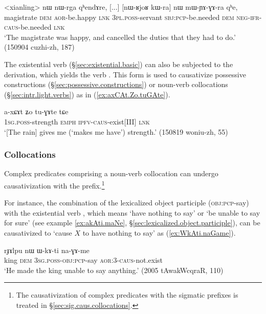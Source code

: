 \begin{exe}
\ex \label{ex:mWYAGAra}
\gll <xianling> nɯ nɯ-rga qʰendɤre, [...] [nɯ-ʁjoʁ kɯ-ra] nɯ mɯ-ɲɤ-ɣɤ-ra qʰe, \\
magistrate \textsc{dem} \textsc{aor}-be.happy \textsc{lnk} { } \textsc{3pl}.\textsc{poss}-servant \textsc{sbj}:\textsc{pcp}-be.needed \textsc{dem} \textsc{neg}-\textsc{ifr}-\textsc{caus}-be.needed \textsc{lnk} \\
\glt `The magistrate was happy, and cancelled the duties that they had to do.' (150904 cuzhi-zh, 187)
\end{exe}
 
 The existential verb   (§\ref{sec:existential.basic}) can also be subjected to the  derivation, which yields the verb . This form is used to causativize possessive constructions (§\ref {sec:possessive.constructions}) or noun-verb collocations (§\ref{sec:intr.light.verbs}) as in (\ref{ex:axCAt.Zo.tuGAte}).
 
\begin{exe}
\ex \label{ex:axCAt.Zo.tuGAte}
\gll  a-xɕɤt ʑo tu-ɣɤte tɕe \\
\textsc{1sg}.\textsc{poss}-strength \textsc{emph} \textsc{ipfv}-\textsc{caus}-exist[III] \textsc{lnk} \\
\glt `[The rain] gives me (`makes me have') strength.' (150819 woniu-zh, 55)
\end{exe}

\subsubsection{Collocations} \label{sec:velar.causative.collocation}
Complex predicates comprising a noun-verb collocation can undergo causativization with the  prefix.\footnote{The causativization of complex predicates with the sigmatic prefixes is treated in §\ref{sec:sig.caus.collocations}. }

For instance, the combination of the lexicalized object participle  (\textsc{obj}:\textsc{pcp}-say) with the existential verb , which means  `have nothing to say' or `be unable to say for sure' (see example \ref{ex:akAti.maNe}, §\ref{sec:lexicalized.object.participle}), can be causativized to  `cause $X$ to have nothing to say' as (\ref{ex:WkAti.naGame}).

\begin{exe}
\ex \label{ex:WkAti.naGame}
\gll rɟɤlpu nɯ ɯ-kɤ-ti na-ɣɤ-me \\
king \textsc{dem} \textsc{3sg}.\textsc{poss}-\textsc{obj}:\textsc{pcp}-say \textsc{aor}:3\flobv{}-\textsc{caus}-not.exist \\
\glt `He made the king unable to say anything.' (2005 tAwakWcqraR, 110)
\end{exe}
 

